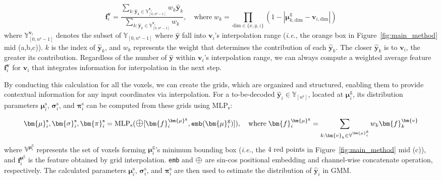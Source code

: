 \documentclass{article} %
\newcommand{\ie}{\textit{i.e.}}
\newcommand{\midoplus}{\mathlarger{\mathlarger{\oplus}}}
\begin{document}
\vspace{-10pt}
\begin{equation}
    \bm{f}^{\bm{v}}_i = \frac{\sum_{k: \hat{\bm{y}}_k \in \mathbb{Y}_{[0,n^\text{s}-1]}^{\bm{v}_i}} w_k\hat{\bm{y}}_k}{\sum_{k: \hat{\bm{y}}_k \in \mathbb{Y}_{[0,n^\text{s}-1]}^{\bm{v}_i}} w_k}, \quad\text{where}\; w_k=\prod_{\text{dim}\in\{x,y,z\}}\left(1-|\bm{\mu}^\text{g}_{k,\text{dim}}-\bm{v}_{i,\text{dim}}|\right)
\label{eq:grid_creator}
\end{equation}
where $\mathbb{Y}_{[0,n^\text{s}-1]}^{\bm{v}_i}$ denotes the subset of $\mathbb{Y}_{[0,n^\text{s}-1]}$ where $\hat{\bm{y}}$ fall into $\bm{v}_i$'s interpolation range (\ie, the \textcolor[RGB]{223,113,50}{orange box} in Figure~\ref{fig:main_method} mid (a,b,c)).
$k$ is the index of $\hat{\bm{y}}_k$, and $w_k$ represents the weight that determines the contribution of each $\hat{\bm{y}}_k$. The closer $\hat{\bm{y}}_k$ is to $\bm{v}_i$, the greater its contribution. Regardless of the number of $\hat{\bm{y}}$ within $\bm{v}_i$'s interpolation range, we can always compute a weighted average feature $\bm{f}^{\bm{v}}_i$ for ${\bm{v}_i}$ that integrates information for interpolation in the next step.

By conducting this calculation for all the voxels, we can create the grids, which are organized and structured, enabling them to provide contextual information for any input coordinates via interpolation. For a to-be-decoded $\hat{\bm{y}}_i \in \mathbb{Y}_{[n^\text{s}]}$, located at $\bm{\mu}_i^\text{g}$, its distribution parameters $\bm{\mu}^\text{s}_i$, $\bm{\sigma}^\text{s}_i$, and $\bm{\pi}^\text{s}_i$ can be computed from these grids using $\text{MLP}_\text{s}$:


\vspace{-6pt}
\begin{equation}
    \bm{\mu}^\text{s}_i, \bm{\sigma}^\text{s}_i, \bm{\pi}^\text{s}_i = \text{MLP}_\text{s} (\midoplus[\bm{f}^{\bm{\mu}^\text{g}}_i, \texttt{emb}(\bm{\mu}^\text{g}_i)]), \quad \text{where}\; \bm{f}^{\bm{\mu}^\text{g}}_i = \sum_{k: \bm{v}_k \in \mathbb{V}^{\bm{\mu}^\text{g}_i}}w_k \bm{f}^{\bm{v}}_k
\label{eq:grid_interpolation}
\end{equation}
where $\mathbb{V}^{\bm{\mu}^\text{g}_i}$ represents the set of voxels forming $\bm{\mu}_i^\text{g}$'s minimum bounding box (\ie, the \textcolor[RGB]{192,0,0}{$4$ red points} in Figure~\ref{fig:main_method} mid (c)), 
and $\bm{f}^{\bm{\mu}^\text{g}}_i$ is the feature obtained by grid interpolation. \texttt{emb} and $\midoplus$ are sin-cos positional embedding and channel-wise concatenate operation, respectively. The calculated parameters $\bm{\mu}^\text{s}_i$, $\bm{\sigma}^\text{s}_i$, and $\bm{\pi}^\text{s}_i$ are then used to estimate the distribution of $\hat{\bm{y}}_i$ in GMM.
\end{document}
